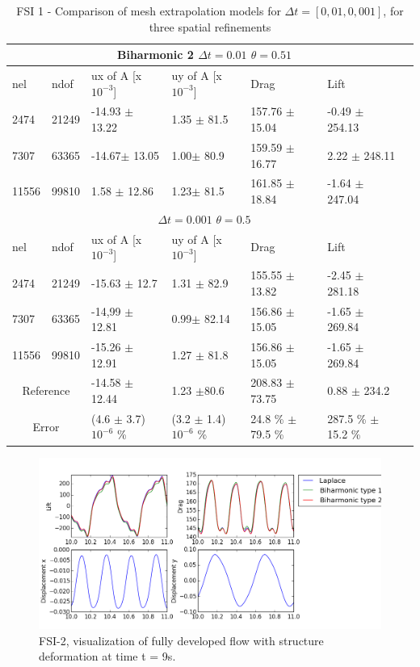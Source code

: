 \begin{table}[h!]
\centering
\label{my-label}
\begin{tabular}{ |p{1cm}||p{1cm}|p{3.2cm}|p{3.2cm}|p{2.9cm}|p{3.1cm}|p{1.2cm}|}
 \hline
  \multicolumn{6}{|c|}{Biharmonic 2 \hspace{2mm}  $\Delta t = 0.01$  \hspace{2mm}  $\theta = 0.51$} \\
   \hline
nel & ndof & ux of A [x $10^{-3}$]  &uy of A [x $10^{-3}$]& Drag  & Lift \\
 \hline
 2474    & 21249  & -14.93 $\pm$ 13.22 & 1.35 $\pm$ 81.5 & 157.76  $\pm$ 15.04 & -0.49  $\pm$  254.13 \\
 7307    & 63365  & -14.67$\pm$ 13.05 & 1.00$\pm$ 80.9& 159.59 $\pm$  16.77 & 2.22 $\pm$  248.11  \\
 11556   & 99810  & 1.58 $\pm$ 12.86 & 1.23$\pm$ 81.5& 161.85   $\pm$18.84 & -1.64  $\pm$  247.04 \\
 \hline
  \multicolumn{6}{|c|}{$\Delta t = 0.001$  \hspace{2mm}  $\theta = 0.5$} \\
   \hline
 nel & ndof & ux of A [x $10^{-3}$]  &uy of A [x $10^{-3}$]& Drag  & Lift \\
\hline
 2474    & 21249  & -15.63  $\pm$ 12.7 & 1.31 $\pm$ 82.9 & 155.55      $\pm$ 13.82 & -2.45   $\pm$ 281.18 \\
 7307    & 63365  &  -14,99 $\pm$ 12.81& 0.99$\pm$ 82.14& 156.86    $\pm$  15.05 & -1.65   $\pm$ 269.84 \\
 11556   & 99810  &  -15.26 $\pm$ 12.91 & 1.27  $\pm$ 81.8 & 156.86   $\pm$ 15.05 & -1.65 $\pm$ 269.84 \\
 \hline
\multicolumn{2}{|c|}{Reference} & -14.58 $\pm$ 12.44   & 1.23 $\pm$80.6    & 208.83 $\pm$ 73.75 & 0.88 $\pm$ 234.2 \\
 \hline
\multicolumn{2}{|c|}{Error}  & (4.6 $\pm$ 3.7)$10^{-6}$ \% & (3.2 $\pm$ 1.4)$10^{-6}$ \%& 24.8 \% $\pm$ 79.5 \% & 287.5 \% $\pm$ 15.2 \% \\
 \hline
\end{tabular}
\caption{FSI 1 - Comparison of mesh extrapolation models for $\Delta t = [0,01, 0,001]$, for three spatial refinements}
\end{table}
\newpage
\begin{figure}[h!]
  \centering
    \includegraphics[scale=0.64]{./Fig/fsi2compare.png}
      \caption{FSI-2, visualization of fully developed flow with structure deformation at time t = 9s.}
\end{figure}
